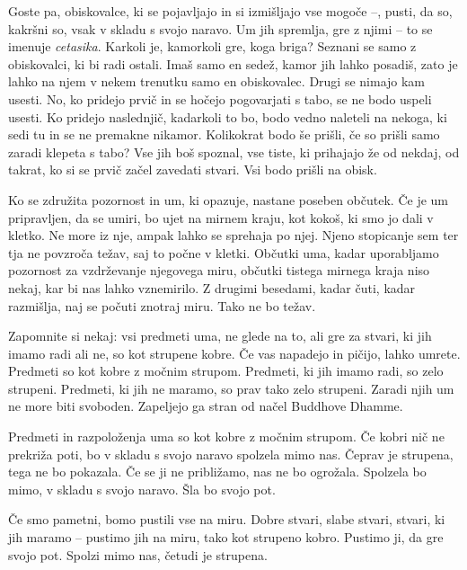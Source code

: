 Goste pa, obiskovalce, ki se pojavljajo in si izmišljajo vse mogoče –, pusti, da so, kakršni so, vsak v skladu s svojo naravo. Um jih spremlja, gre z njimi – to se imenuje \emph{cetasika}. Karkoli je, kamorkoli gre, koga briga? Seznani se samo z obiskovalci, ki bi radi ostali. Imaš samo en sedež, kamor jih lahko posadiš, zato je lahko na njem v nekem trenutku samo en obiskovalec. Drugi se nimajo kam usesti. No, ko pridejo prvič in se hočejo pogovarjati s tabo, se ne bodo uspeli usesti. Ko pridejo naslednjič, kadarkoli to bo, bodo vedno naleteli na nekoga, ki sedi tu in se ne premakne nikamor. Kolikokrat bodo še prišli, če so prišli samo zaradi klepeta s tabo? Vse jih boš spoznal, vse tiste, ki prihajajo že od nekdaj, od takrat, ko si se prvič začel zavedati stvari. Vsi bodo prišli na obisk.

\clearpage


Ko se združita pozornost in um, ki opazuje, nastane poseben občutek. Če je um pripravljen, da se umiri, bo ujet na mirnem kraju, kot kokoš, ki smo jo dali v kletko. Ne more iz nje, ampak lahko se sprehaja po njej. Njeno stopicanje sem ter tja ne povzroča težav, saj to počne v kletki. Občutki uma, kadar uporabljamo pozornost za vzdrževanje njegovega miru, občutki tistega mirnega kraja niso nekaj, kar bi nas lahko vznemirilo. Z drugimi besedami, kadar čuti, kadar razmišlja, naj se počuti znotraj miru. Tako ne bo težav.


Zapomnite si nekaj: vsi predmeti uma, ne glede na to, ali gre za stvari, ki jih imamo radi ali ne, so kot strupene kobre. Če vas napadejo in pičijo, lahko umrete. Predmeti so kot kobre z močnim strupom. Predmeti, ki jih imamo radi, so zelo strupeni. Predmeti, ki jih ne maramo, so prav tako zelo strupeni. Zaradi njih um ne more biti svoboden. Zapeljejo ga stran od načel Buddhove Dhamme.

\clearpage


Predmeti in razpoloženja uma so kot kobre z močnim strupom. Če kobri nič ne prekriža poti, bo v skladu s svojo naravo spolzela mimo nas. Čeprav je strupena, tega ne bo pokazala. Če se ji ne približamo, nas ne bo ogrožala. Spolzela bo mimo, v skladu s svojo naravo. Šla bo svojo pot.

Če smo pametni, bomo pustili vse na miru. Dobre stvari, slabe stvari, stvari, ki jih maramo – pustimo jih na miru, tako kot strupeno kobro. Pustimo ji, da gre svojo pot. Spolzi mimo nas, četudi je strupena.

